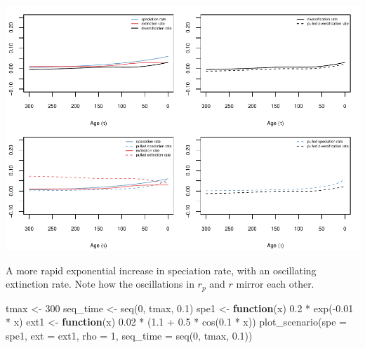 \documentclass[
]{article}
\newenvironment{Shaded}{\begin{snugshade}}{\end{snugshade}}
\newcommand{\AttributeTok}[1]{\textcolor[rgb]{0.77,0.63,0.00}{#1}}
\newcommand{\ControlFlowTok}[1]{\textcolor[rgb]{0.13,0.29,0.53}{\textbf{#1}}}
\newcommand{\DecValTok}[1]{\textcolor[rgb]{0.00,0.00,0.81}{#1}}
\newcommand{\FloatTok}[1]{\textcolor[rgb]{0.00,0.00,0.81}{#1}}
\newcommand{\FunctionTok}[1]{\textcolor[rgb]{0.00,0.00,0.00}{#1}}
\newcommand{\NormalTok}[1]{#1}
\newcommand{\OtherTok}[1]{\textcolor[rgb]{0.56,0.35,0.01}{#1}}
\newcommand{\SpecialCharTok}[1]{\textcolor[rgb]{0.00,0.00,0.00}{#1}}
\begin{document}
\includegraphics{supplement_files/figure-latex/unnamed-chunk-10-1.pdf}

\pagebreak

A more rapid exponential increase in speciation rate, with an
oscillating extinction rate. Note how the oscillations in \(r_p\) and
\(r\) mirror each other.

\begin{Shaded}
\begin{Highlighting}[]
\NormalTok{tmax }\OtherTok{\textless{}{-}} \DecValTok{300}
\NormalTok{seq\_time }\OtherTok{\textless{}{-}} \FunctionTok{seq}\NormalTok{(}\DecValTok{0}\NormalTok{, tmax, }\FloatTok{0.1}\NormalTok{)}
\NormalTok{spe1 }\OtherTok{\textless{}{-}} \ControlFlowTok{function}\NormalTok{(x) }\FloatTok{0.2} \SpecialCharTok{*} \FunctionTok{exp}\NormalTok{(}\SpecialCharTok{{-}}\FloatTok{0.01} \SpecialCharTok{*}\NormalTok{ x)}
\NormalTok{ext1 }\OtherTok{\textless{}{-}} \ControlFlowTok{function}\NormalTok{(x) }\FloatTok{0.02} \SpecialCharTok{*}\NormalTok{ (}\FloatTok{1.1} \SpecialCharTok{+} \FloatTok{0.5} \SpecialCharTok{*} \FunctionTok{cos}\NormalTok{(}\FloatTok{0.1} \SpecialCharTok{*}\NormalTok{ x))}
\FunctionTok{plot\_scenario}\NormalTok{(}\AttributeTok{spe =}\NormalTok{ spe1, }\AttributeTok{ext =}\NormalTok{ ext1, }\AttributeTok{rho =} \DecValTok{1}\NormalTok{, }\AttributeTok{seq\_time =} \FunctionTok{seq}\NormalTok{(}\DecValTok{0}\NormalTok{,}
\NormalTok{    tmax, }\FloatTok{0.1}\NormalTok{))}
\end{Highlighting}
\end{Shaded}
\end{document}
